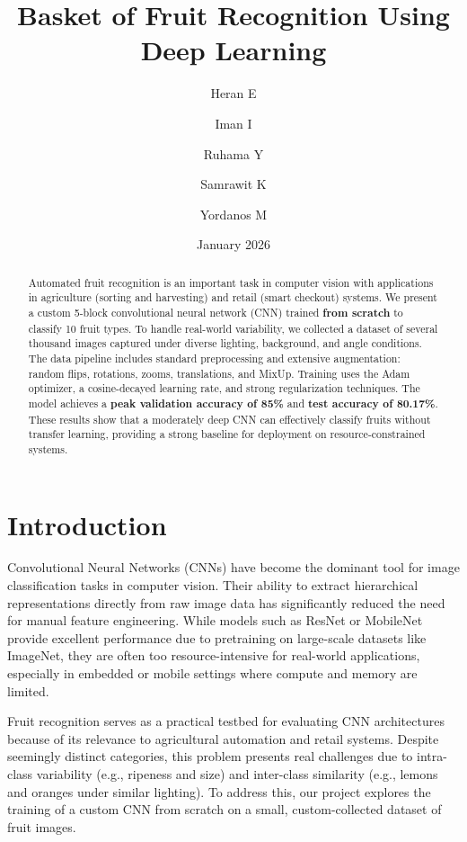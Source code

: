 \documentclass{article}
\title{Basket of Fruit Recognition Using Deep Learning}
\author[1]{Heran E}
\author[1]{Iman I}
\author[1]{Ruhama Y}
\author[1]{Samrawit K}
\author[1]{Yordanos M}
\affil[1]{School of Information Technology and Engineering, Addis Ababa University, Ethiopia}
\date{January 2026}
\begin{document}
\maketitle

\begin{abstract}
Automated fruit recognition is an important task in computer vision with applications in agriculture (sorting and harvesting) and retail (smart checkout) systems. We present a custom 5-block convolutional neural network (CNN) trained \textbf{from scratch} to classify 10 fruit types. To handle real-world variability, we collected a dataset of several thousand images captured under diverse lighting, background, and angle conditions. The data pipeline includes standard preprocessing and extensive augmentation: random flips, rotations, zooms, translations, and MixUp. Training uses the Adam optimizer, a cosine-decayed learning rate, and strong regularization techniques. The model achieves a \textbf{peak validation accuracy of 85\%} and \textbf{test accuracy of 80.17\%}. These results show that a moderately deep CNN can effectively classify fruits without transfer learning, providing a strong baseline for deployment on resource-constrained systems.
\end{abstract}

\section{Introduction}
Convolutional Neural Networks (CNNs) have become the dominant tool for image classification tasks in computer vision. Their ability to extract hierarchical representations directly from raw image data has significantly reduced the need for manual feature engineering. While models such as ResNet or MobileNet provide excellent performance due to pretraining on large-scale datasets like ImageNet, they are often too resource-intensive for real-world applications, especially in embedded or mobile settings where compute and memory are limited.

Fruit recognition serves as a practical testbed for evaluating CNN architectures because of its relevance to agricultural automation and retail systems. Despite seemingly distinct categories, this problem presents real challenges due to intra-class variability (e.g., ripeness and size) and inter-class similarity (e.g., lemons and oranges under similar lighting). To address this, our project explores the training of a custom CNN from scratch on a small, custom-collected dataset of fruit images.
\end{document}

